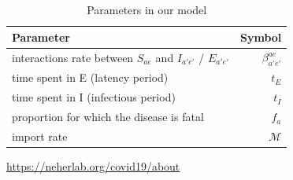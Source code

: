 \documentclass{article}
\begin{document}
\begin{table}[H]
	\centering
	\begin{tabular}{l r} %
		\toprule
		\textbf{Parameter} & \textbf{Symbol} \\ %
		\midrule
		interactions rate between $S_{ae}$ and $I_{a'e'}$ / $E_{a'e'}$  & $\beta^{ae}_{a'e'}$ \\ %
		time spent in E (latency period) & $t_E$ \\ %
		time spent in I (infectious period) & $t_I$ \\ %
		proportion for which the disease is fatal & $f_a$ \\ %
		import rate & $\mathcal{M}$ \\
		\bottomrule
	\end{tabular}
	\caption{Parameters in our model}
	\label{table:our_model_parameters}
\end{table}











\begin{thebibliography}{20} 

 \url{https://neherlab.org/covid19/about}


\end{thebibliography}
\end{document}
